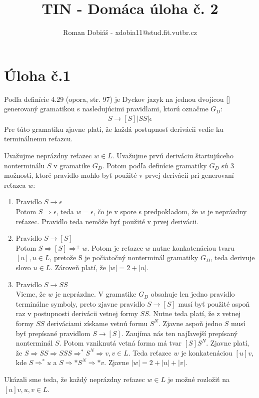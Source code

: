 \documentclass[10pt]{article}
\begin{document}
 
 
 
\title{TIN - Domáca úloha č. 2}%
\author{Roman Dobiáš - xdobia11@stud.fit.vutbr.cz}
 
\maketitle

\section*{Úloha č.1}
Podľa definície 4.29 (opora, str. 97) je Dyckov jazyk na jednou dvojicou [] generovaný 
gramatikou s nasledujúcimi pravidlami, ktorú označme $G_D$:
\begin{align*}
    S \to [ S ] | SS | \epsilon
\end{align*}
Pre túto gramatiku zjavne platí, že každá postupnosť derivácii vedie ku terminálnemu reťazcu.

Uvažujme neprázdny reťazec $w \in L$. Uvažujme prvú deriváciu štartujúceho nonterminálu $S$ v
gramatike $G_D$. Potom podľa definície gramatiky $G_D$ sú 3 možnosti, ktoré pravidlo mohlo byť
použité v prvej derivácii pri generovaní reťazca $w$:
\begin{enumerate}
    \item Pravidlo $S \to \epsilon$\\
        Potom $S \Rightarrow \epsilon$, teda $w = \epsilon$, čo je v spore s predpokladom, že
        $w$ je neprázdny reťazec. Pravidlo teda nemôže byť použité v prvej derivácii.
    \item Pravidlo $S \to [S]$\\
        Potom $S \Rightarrow [S] \Rightarrow^+ w$. Potom je reťazec $w$ nutne konkatenáciou
        tvaru $[u], u \in L$, pretože S je počiatočný nonterminál gramatiky $G_D$, teda derivuje
        slovo $u \in L$. Zároveň platí, že $|w| =  2+|u|$.
    \item Pravidlo $S \to SS$\\
        Vieme, že $w$ je neprázdne. V gramatike $G_D$ obsahuje len jedno pravidlo terminálne symboly,
        preto zjavne pravidlo $S \to [S]$ musí byť použité aspoň raz v postupnosti derivácii vetnej
        formy $SS$. Nutne teda platí, že z vetnej formy $SS$ deriváciami získame vetnú formu $S^N$.
        Zjavne aspoň jedno $S$ musí byť prepísané pravidlom $S \to [S]$. Zaujíma nás ten najľavejší
        prepísaný nonterminál $S$. Potom vzniknutá vetná forma má tvar $[S]S^N$. Zjavne platí, že
        $S \Rightarrow SS \Rightarrow SSS \Rightarrow^* S^N \Rightarrow v, v \in L$. Teda reťazec $w$
        je konkatenáciou $[u]v$, kde $S\Rightarrow^*u$ a $S \Rightarrow* S^N \Rightarrow* v$. Zjavne
        $|w| = 2 + |u|+|v|$.
\end{enumerate}
Ukázali sme teda, že každý neprázdny reťazec $w \in L$ je možné rozložiť na $[u]v, u,v \in L$.
\end{document}
